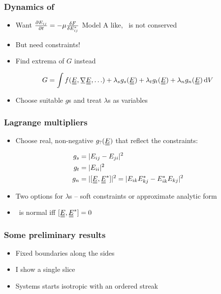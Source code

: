 \documentclass[10pt,mathserif]{beamer}
\begin{document}
\begin{frame}
    \frametitle{Dynamics of \EE}
    \begin{itemize}
        \item Want $\pdv{E_{ij}}{t} = -\mu\fdv{F}{E_{ij}^*}$ \color{gray} Model A like, \EE\ is not conserved \normalcolor
        \item But need constraints!
        \item Find extrema of $G$ instead
    \end{itemize}
    \begin{align*}
        G = \int f(\du{E}, \su{\nabla}\du{E}, \ldots) + \lambda_s g_s(\du{E}) + \lambda_t g_t(\du{E}) + \lambda_n g_n(\du{E}) \dd{V}
    \end{align*}
    \begin{itemize}
        \item Choose suitable $g$s and treat $\lambda$s as variables
    \end{itemize}
\end{frame}

\begin{frame}
    \frametitle{Lagrange multipliers}
    \begin{itemize}
        \item Choose real, non-negative $g_?(\du{E})$ that reflect the constraints:
    \end{itemize}
    \begin{align*}
        g_s &= |E_{ij} - E_{ji}|^2 \\
        g_t &= |E_{ii}|^2 \\
        g_n &= |[\du{E}, \du{E}^*]|^2 = |E_{ik}E_{kj}^* - E_{ik}^*E_{kj}|^2
    \end{align*}
    \begin{itemize}
        \item Two options for $\lambda$s -- soft constraints or approximate analytic form
        \item \color{gray} \EE\ is normal iff $[\du{E}, \du{E}^*] = 0$ \normalcolor
    \end{itemize}
\end{frame}

\begin{frame}
    \frametitle{Some preliminary results}
    \begin{itemize}
        \item Fixed boundaries along the sides
        \item I show a single slice
        \item Systems starts isotropic with an ordered streak
    \end{itemize}
\end{frame}
\end{document}
